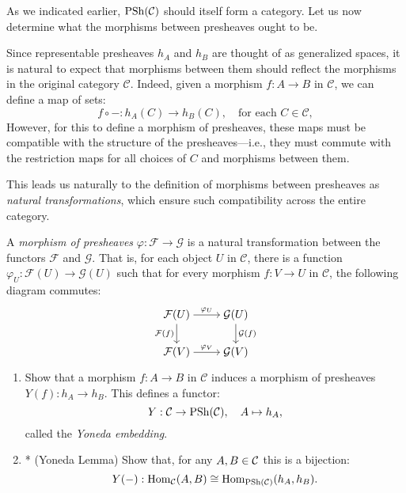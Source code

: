 As we indicated earlier, $\mathrm{PSh}(\mathcal{C})$ should itself form a category. Let us now determine what the morphisms between presheaves ought to be.

Since representable presheaves $h_A$ and $h_B$ are thought of as generalized spaces, it is natural to expect that morphisms between them should reflect the morphisms in the original category $\mathcal{C}$. Indeed, given a morphism $f: A \to B$ in $\mathcal{C}$, we can define a map of sets:
\[
f \circ - : h_A(C) \to h_B(C), \quad \text{for each } C \in \mathcal{C},
\]
However, for this to define a morphism of presheaves, these maps must be compatible with the structure of the presheaves—i.e., they must commute with the restriction maps for all choices of $C$ and morphisms between them.

This leads us naturally to the definition of morphisms between presheaves as \emph{natural transformations}, which ensure such compatibility across the entire category.

\begin{definition}
A \emph{morphism of presheaves} $\varphi: \mathcal{F} \to \mathcal{G}$ is a natural transformation between the functors $\mathcal{F}$ and $\mathcal{G}$. That is, for each object $U$ in $\mathcal{C}$, there is a function $\varphi_U: \mathcal{F}(U) \to \mathcal{G}(U)$ such that for every morphism $f: V \to U$ in $\mathcal{C}$, the following diagram commutes:
\[\begin{tikzcd}[ampersand replacement=\&,cramped]
  \mathcal{F}(U) \&  \mathcal{G}(U) \\
\mathcal{F}(V)   \& \mathcal{G}(V)
	\arrow["{\varphi_U}", from=1-1, to=1-2]
	\arrow["{\mathcal{F}(f)}"', from=1-1, to=2-1]
	\arrow["{\mathcal{G}(f)}", from=1-2, to=2-2]
	\arrow["{\varphi_V}", from=2-1, to=2-2]
\end{tikzcd}\]

\end{definition}
\begin{exercise}
\begin{enumerate}
    \item Show that a morphism $f: A \to B$ in $\mathcal{C}$ induces a morphism of presheaves $Y(f): h_A \to h_B$. This defines a functor:
    \[
    Y: \mathcal{C} \to \mathrm{PSh}(\mathcal{C}), \quad A \mapsto h_A,
    \]
    called the \emph{Yoneda embedding}.
    \item* (Yoneda Lemma) Show that, for any $A,B\in \mathcal{C}$ this is a bijection:
    \[
    Y(-): \mathrm{Hom}_{\mathcal{C}}(A, B) \cong \mathrm{Hom}_{\mathrm{PSh}(\mathcal{C})}(h_A, h_B).
    \]
\end{enumerate}
\end{exercise}

